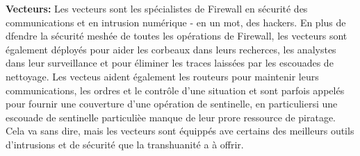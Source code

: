 \textbf{Vecteurs:} Les vecteurs sont les spécialistes de Firewall en sécurité des communications et en intrusion numérique - en un mot, des hackers. En plus de dfendre la sécurité meshée de toutes les opérations de Firewall, les vecteurs sont également déployés pour aider les corbeaux dans leurs recherces, les analystes dans leur surveillance et pour éliminer les traces laissées par les escouades de nettoyage. Les vecteus aident également les routeurs pour maintenir leurs communications, les ordres et le contrôle d'une situation et sont parfois appelés pour fournir une couverture d'une opération de sentinelle, en particuliersi une escouade de sentinelle particulièe manque de leur prore ressource de piratage. Cela va sans dire, mais les vecteurs sont équippés ave certains des meilleurs outils d'intrusions et de sécurité que la transhuanité a à offrir. 

